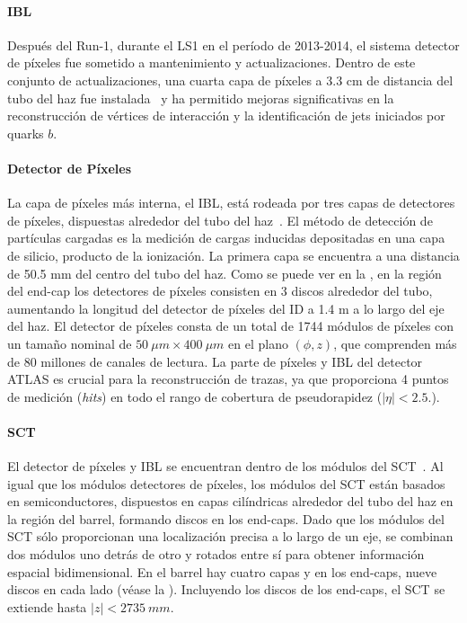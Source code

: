 \paragraph{\acf{IBL}}
Después del Run-1, durante el \ac{LS1} en el período de 2013-2014, el sistema detector de píxeles fue sometido a mantenimiento y actualizaciones. Dentro de este conjunto de actualizaciones, una cuarta capa de píxeles a 3.3 cm de distancia del tubo del haz fue instalada~\cite{ATLAS-IBL-TDR,ATLAS-IBL-proceedings} y ha permitido mejoras significativas en la reconstrucción de vértices de interacción y la identificación de jets iniciados por quarks \(b\).


\paragraph{Detector de Píxeles}
La capa de píxeles más interna, el \ac{IBL}, está rodeada por tres capas de detectores de píxeles, dispuestas alrededor del tubo del haz~\cite{ATLAS-Pixel-DesignPerformance,ATLAS-Pixel-Performance-Proceedings}. El método de detección de partículas cargadas es la medición de cargas inducidas depositadas en una capa de silicio, producto de la ionización. La primera capa se encuentra a una distancia de 50.5 mm del centro del tubo del haz. Como se puede ver en la \Fig{\ref{fig:atlas:atlas:atlas_inner_detector:general}}, en la región del end-cap los detectores de píxeles consisten en 3 discos alrededor del tubo, aumentando la longitud del detector de píxeles del \ac{ID} a 1.4 m a lo largo del eje del haz. El detector de píxeles consta de un total de 1744 módulos de píxeles con un tamaño nominal de $50 ~\mu m \times 400 ~\mu m$ en el plano $(\phi, z)$, que comprenden más de 80 millones de canales de lectura.  
La parte de píxeles y \ac{IBL} del detector \ac{ATLAS} es crucial para la reconstrucción de trazas, ya que proporciona 4 puntos de medición (\textit{hits}) en todo el rango de cobertura de pseudorapidez ($|\eta| < 2.5.$).  

\paragraph{\acf{SCT}}
El detector de píxeles y \ac{IBL} se encuentran dentro de los módulos del \ac{SCT}~\cite{ATLAS-SCT}.  
Al igual que los módulos detectores de píxeles, los módulos del \ac{SCT} están basados en semiconductores, dispuestos en capas cilíndricas alrededor del tubo del haz en la región del barrel, formando discos en los end-caps. Dado que los módulos del \ac{SCT} sólo proporcionan una localización precisa a lo largo de un eje, se combinan dos módulos uno detrás de otro y rotados entre sí para obtener información espacial bidimensional. En el barrel hay cuatro capas y en los end-caps, nueve discos en cada lado (véase la \Fig{\ref{fig:atlas:atlas:atlas_inner_detector:general}}). Incluyendo los discos de los end-caps, el \ac{SCT} se extiende hasta $|z| < 2735~mm$.

